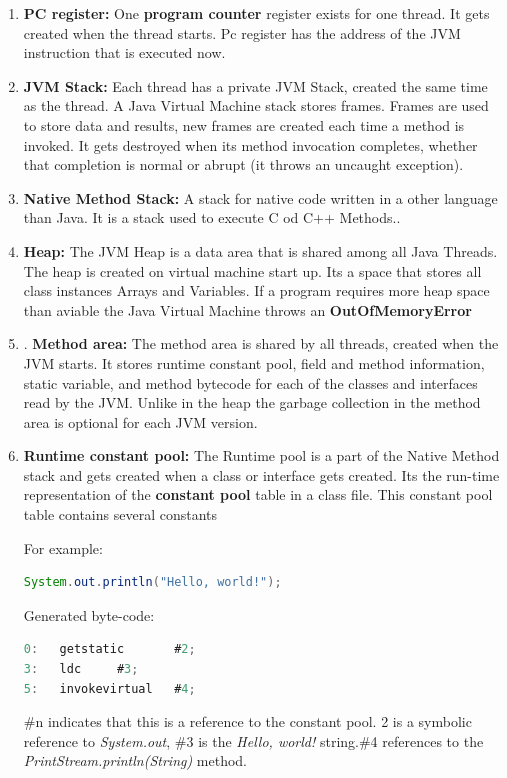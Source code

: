 \begin{enumerate}
\item \textbf{PC register:} One \textbf{program counter} register exists for one thread. It gets created when the thread starts. Pc register has the address of the JVM instruction that is executed now.\cite{javaJVM}
 
\item \textbf{JVM Stack:} Each thread has a private JVM Stack, created the same time as the thread. A Java Virtual Machine stack stores frames. Frames are used to store data and results, new frames are created each time a method is invoked. It gets destroyed when its method invocation completes, whether that completion is normal or abrupt (it throws an uncaught exception). \cite{javaVMOracle}

\item \textbf{Native Method Stack:}
A stack for native code written in a other language than Java. It is a stack used to execute C od C++ Methods.\cite{javaJVM}.  

\item \textbf{Heap:}
The JVM Heap is a data area that is shared among all Java Threads. The heap is created on virtual machine start up.
Its a space that stores all class instances Arrays and Variables. If a program requires more heap space than aviable the Java Virtual Machine throws an \textbf{OutOfMemoryError}\cite{javaVMOracle}

\item. \textbf{Method area:} The method area is shared by all threads, created when the JVM starts. It stores runtime constant pool, field and method information, static variable, and method bytecode for each of the classes and interfaces read by the JVM. Unlike in the heap the garbage collection in the method area is optional for each JVM version. \cite{javaJVM}

\item \textbf{Runtime constant pool:}
The Runtime pool is a part of the Native Method stack and gets created when a class or interface gets created. Its the run-time representation of the \textbf{constant pool} table in a class file. This constant pool table contains several constants \cite{javaVMPaper}

For example:
\begin{lstlisting}[language=Java, caption=Java example Code]
System.out.println("Hello, world!");
\end{lstlisting}
\newpage
Generated byte-code:
\begin{lstlisting}[language=Java, caption= JVM bytecode]
0:   getstatic       #2;               
3:   ldc     #3;                         
5:   invokevirtual   #4; 
\end{lstlisting}
\#n indicates that this is a reference to the constant pool.
2 is a symbolic reference to \textit{System.out}, \#3 is the \textit{Hello, world!} string.\#4 references to the \textit{PrintStream.println(String)} method.
\cite{javaVmstover}  
\end{enumerate}
